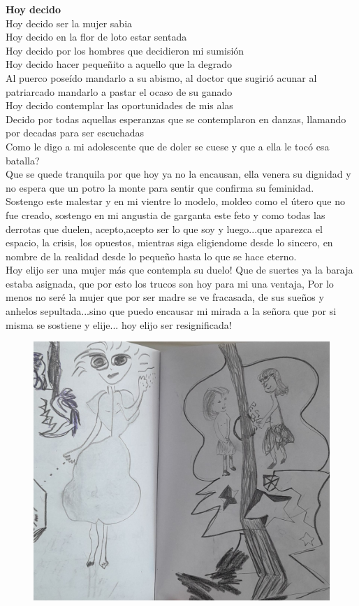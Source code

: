 \documentclass[12pt, a4paper, twoside]{book} %
\begin{document}
\noindent\textbf{Hoy decido}\\
Hoy decido ser la mujer sabia\\
Hoy decido en la flor de loto estar sentada\\
Hoy decido por los hombres que decidieron mi sumisión\\
Hoy decido hacer pequeñito a aquello que la degrado\\
Al puerco poseído mandarlo a su abismo, al doctor que sugirió acunar al patriarcado mandarlo a pastar el  ocaso de su ganado\\
Hoy decido contemplar las oportunidades de mis alas\\
Decido por todas aquellas esperanzas que se contemplaron en danzas, llamando por decadas para  ser escuchadas\\
Como le digo a mi adolescente que de doler se cuese y que a ella le tocó esa batalla?\\
Que se quede tranquila por que hoy ya no la encausan, ella venera su dignidad y no espera que un potro la monte para sentir que confirma su feminidad.\\
Sostengo este malestar y en mi vientre lo modelo, moldeo como el útero que no fue creado, sostengo en mi angustia de garganta este feto y  como todas las derrotas que duelen, acepto,acepto ser lo que soy  y luego...que aparezca el espacio, la crisis, los opuestos, mientras siga eligiendome desde lo sincero, en nombre de la realidad desde lo pequeño hasta lo que se hace eterno.\\
Hoy elijo ser una mujer más que contempla su duelo! Que de suertes ya la baraja estaba asignada, que por esto los trucos son hoy para mi una ventaja, Por lo menos no seré la mujer que por ser madre se ve fracasada,  de sus sueños y anhelos sepultada...sino que puedo encausar mi mirada a la señora que por si misma se sostiene y elije... hoy elijo  ser resignificada!

\begin{figure}[H]
	\centering
	\includegraphics[width=\textwidth]{./images/1f81324df24ae9.jpg}
\end{figure}
\end{document}
